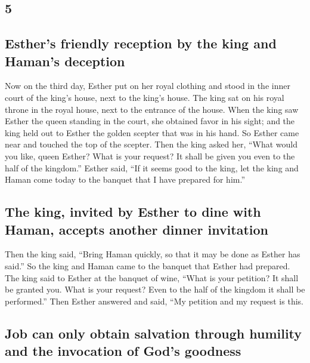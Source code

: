 \begin{paracol}{2}
\begin{otherlanguage}{english}
\hypertarget{section-9}{%
\section{5}\label{section-9}}

\hypertarget{esthers-friendly-reception-by-the-king-and-hamans-deception}{%
\subsection{Esther's friendly reception by the king and Haman's
deception}\label{esthers-friendly-reception-by-the-king-and-hamans-deception}}

 Now on the third day, Esther put on her royal clothing
and stood in the inner court of the king's house, next to the king's
house. The king sat on his royal throne in the royal house, next to the
entrance of the house.  When the king saw Esther the queen
standing in the court, she obtained favor in his sight; and the king
held out to Esther the golden scepter that was in his hand. So Esther
came near and touched the top of the scepter.  Then the
king asked her, ``What would you like, queen Esther? What is your
request? It shall be given you even to the half of the kingdom.''
 Esther said, ``If it seems good to the king, let the king
and Haman come today to the banquet that I have prepared for him.''

\hypertarget{the-king-invited-by-esther-to-dine-with-haman-accepts-another-dinner-invitation}{%
\subsection{The king, invited by Esther to dine with Haman, accepts
another dinner
invitation}\label{the-king-invited-by-esther-to-dine-with-haman-accepts-another-dinner-invitation}}

 Then the king said, ``Bring Haman quickly, so that it may
be done as Esther has said.'' So the king and Haman came to the banquet
that Esther had prepared.  The king said to Esther at the
banquet of wine, ``What is your petition? It shall be granted you. What
is your request? Even to the half of the kingdom it shall be
performed.''  Then Esther answered and said, ``My petition
and my request is this.

\hypertarget{job-can-only-obtain-salvation-through-humility-and-the-invocation-of-gods-goodness}{%
\subsection{Job can only obtain salvation through humility and the
invocation of God's
goodness}\label{job-can-only-obtain-salvation-through-humility-and-the-invocation-of-gods-goodness}}


\end{otherlanguage}
\end{paracol}
